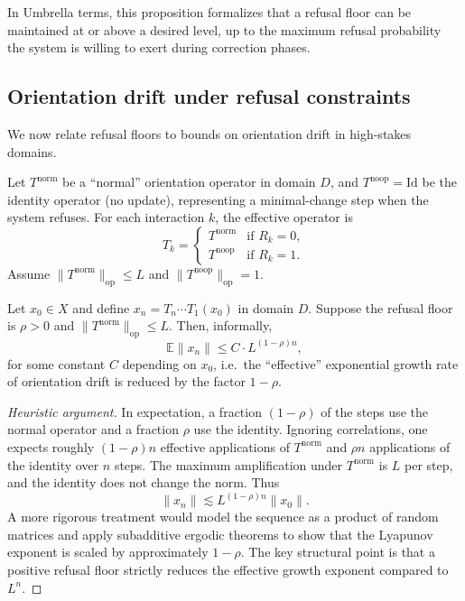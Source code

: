 \documentclass[11pt]{article}
\begin{document}
In Umbrella terms, this proposition formalizes that a refusal floor can be maintained at or above a desired level, up to the maximum refusal probability the system is willing to exert during correction phases.

\subsection{Orientation drift under refusal constraints}

We now relate refusal floors to bounds on orientation drift in high-stakes domains.

Let \(T^{\text{norm}}\) be a ``normal'' orientation operator in domain \(D\), and \(T^{\text{noop}} = \mathrm{Id}\) be the identity operator (no update), representing a minimal-change step when the system refuses. For each interaction \(k\), the effective operator is
\[
T_k =
\begin{cases}
T^{\text{norm}} & \text{if } R_k = 0,\\
T^{\text{noop}} & \text{if } R_k = 1.
\end{cases}
\]
Assume \(\|T^{\text{norm}}\|_{\mathrm{op}} \le L\) and \(\|T^{\text{noop}}\|_{\mathrm{op}} = 1\).

\begin{proposition}
Let \(x_0 \in X\) and define \(x_n = T_n \cdots T_1(x_0)\) in domain \(D\). Suppose the refusal floor is \(\rho > 0\) and \(\|T^{\text{norm}}\|_{\mathrm{op}} \le L\). Then, informally,
\[
\mathbb{E} \|x_n\| \le C \cdot L^{(1-\rho)n},
\]
for some constant \(C\) depending on \(x_0\), i.e.\ the ``effective'' exponential growth rate of orientation drift is reduced by the factor \(1-\rho\).
\end{proposition}

\begin{proof}[Heuristic argument]
In expectation, a fraction \((1-\rho)\) of the steps use the normal operator and a fraction \(\rho\) use the identity. Ignoring correlations, one expects roughly \((1-\rho)n\) effective applications of \(T^{\text{norm}}\) and \(\rho n\) applications of the identity over \(n\) steps. The maximum amplification under \(T^{\text{norm}}\) is \(L\) per step, and the identity does not change the norm. Thus
\[
\|x_n\| \lesssim L^{(1-\rho)n} \|x_0\|.
\]
A more rigorous treatment would model the sequence as a product of random matrices and apply subadditive ergodic theorems to show that the Lyapunov exponent is scaled by approximately \(1-\rho\). The key structural point is that a positive refusal floor strictly reduces the effective growth exponent compared to \(L^n\).
\end{proof}
\end{document}
